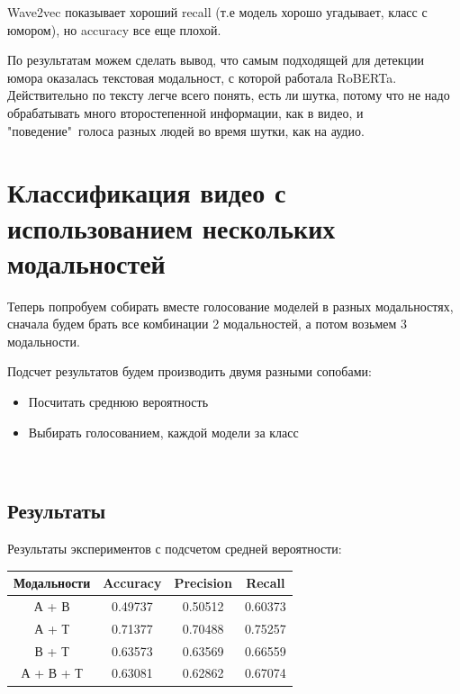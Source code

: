 \documentclass[PMI,VKR]{HSEUniversity}
\begin{document}
Wave2vec показывает хороший recall (т.е модель хорошо угадывает, класс с юмором), но accuracy все еще плохой.

По результатам можем сделать вывод, что самым подходящей для детекции юмора оказалась текстовая модальност, с которой работала RoBERTa. Действительно по тексту легче всего понять, есть ли шутка, потому что не надо обрабатывать много второстепенной информации, как в видео, и "поведение"\ голоса разных людей во время шутки, как на аудио.

\section{Классификация видео с использованием нескольких модальностей}

Теперь попробуем собирать вместе голосование моделей в разных модальностях, сначала будем брать все комбинации 2 модальностей, а потом возьмем 3 модальности.

Подсчет результатов будем производить двумя разными сопобами:
\begin{itemize}
    \item Посчитать среднюю вероятность
    \item Выбирать голосованием, каждой модели за класс
\end{itemize} \\

\subsection{Результаты}

Результаты экспериментов с подсчетом средней вероятности: \\

\begin{center}
    \begin{tabular}{ |c||c|c|c| }
        \hline
        Модальности & Accuracy & Precision & Recall  \\
        \hline
        А + В       & 0.49737  & 0.50512   & 0.60373 \\
        А + Т       & 0.71377  & 0.70488   & 0.75257 \\
        В + Т       & 0.63573  & 0.63569   & 0.66559 \\
        А + В + Т   & 0.63081  & 0.62862   & 0.67074 \\
        \hline
    \end{tabular}
\end{center} \\
\end{document}

